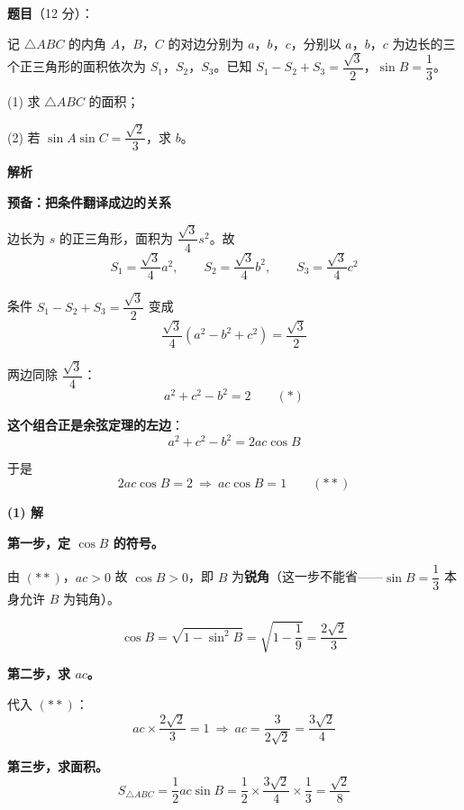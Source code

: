 \begin{answer}

\textbf{题目}（12 分）：

记 $\triangle ABC$ 的内角 $A$，$B$，$C$ 的对边分别为 $a$，$b$，$c$，分别以 $a$，$b$，$c$ 为边长的三个正三角形的面积依次为 $S_1$，$S_2$，$S_3$。已知 $S_1-S_2+S_3=\dfrac{\sqrt3}2$，$\sin B=\dfrac13$。

  (1) 求 $\triangle ABC$ 的面积；

  (2) 若 $\sin A\sin C=\dfrac{\sqrt2}3$，求 $b$。

\textbf{解析}

\par\medskip

\textbf{预备：把条件翻译成边的关系}

边长为 $s$ 的正三角形，面积为 $\dfrac{\sqrt3}4s^{2}$。故
\nopagebreak[4]
\[S_1=\frac{\sqrt3}4a^{2},\qquad S_2=\frac{\sqrt3}4b^{2},\qquad S_3=\frac{\sqrt3}4c^{2}\]

条件 $S_1-S_2+S_3=\dfrac{\sqrt3}2$ 变成
\nopagebreak[4]
\[\frac{\sqrt3}4\left(a^{2}-b^{2}+c^{2}\right)=\frac{\sqrt3}2\]

两边同除 $\dfrac{\sqrt3}4$：
\nopagebreak[4]
\[a^{2}+c^{2}-b^{2}=2\qquad(\ast)\]

\textbf{这个组合正是余弦定理的左边}：
\nopagebreak[4]
\[a^{2}+c^{2}-b^{2}=2ac\cos B\]

于是
\nopagebreak[4]
\[2ac\cos B=2\ \Longrightarrow\ ac\cos B=1\qquad(\ast\ast)\]

\par\medskip

\textbf{(1) 解}

\textbf{第一步，定 $\cos B$ 的符号。}

由 $(\ast\ast)$，$ac>0$ 故 $\cos B>0$，即 $B$ 为\textbf{锐角}（这一步不能省——$\sin B=\dfrac13$ 本身允许 $B$ 为钝角）。

\nopagebreak[4]
\[\cos B=\sqrt{1-\sin^{2}B}=\sqrt{1-\frac19}=\frac{2\sqrt2}3\]

\textbf{第二步，求 $ac$。}

代入 $(\ast\ast)$：
\nopagebreak[4]
\[ac\times\frac{2\sqrt2}3=1\ \Longrightarrow\ ac=\frac3{2\sqrt2}=\frac{3\sqrt2}4\]

\textbf{第三步，求面积。}
\nopagebreak[4]
\[S_{\triangle ABC}=\frac12ac\sin B=\frac12\times\frac{3\sqrt2}4\times\frac13=\frac{\sqrt2}8\]


\end{answer}
